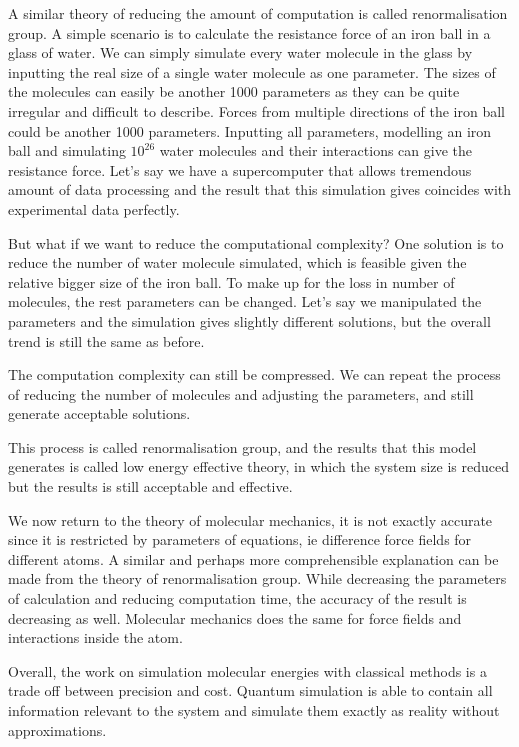 \documentclass[12pt]{article}
\begin{document}
A similar theory of reducing the amount of computation is called renormalisation group. A simple scenario is to calculate the resistance force of an
 iron ball in a glass of water. We can simply simulate every water molecule in the glass by inputting the real size of a single water molecule as one
  parameter. The sizes of the molecules can easily be another 1000 parameters as they can be quite irregular and difficult to describe. Forces from
  multiple directions of the iron ball could be another 1000 parameters. Inputting all parameters, modelling an iron ball and simulating $10^{26}$
  water molecules and their interactions can give the resistance force. Let’s say we have a supercomputer that allows tremendous amount of data
  processing and the result that this simulation gives coincides with experimental data perfectly.

But what if we want to reduce the computational complexity? One solution is to reduce the number of water molecule simulated, which is feasible given
 the relative bigger size of the iron ball. To make up for the loss in number of molecules, the rest parameters can be changed. Let’s say we
 manipulated the parameters and the simulation gives slightly different solutions, but the overall trend is still the same as before.

The computation complexity can still be compressed. We can repeat the process of reducing the number of molecules and adjusting the parameters,
 and still generate acceptable solutions.

This process is called renormalisation group, and the results that this model generates is called low energy effective theory, in which the system
 size is reduced but the results is still acceptable and effective.

We now return to the theory of molecular mechanics, it is not exactly accurate since it is restricted by parameters of equations, ie difference
force fields for different atoms. A similar and perhaps more comprehensible explanation can be made from the theory of renormalisation group.
While decreasing the parameters of calculation and reducing computation time, the accuracy of the result is decreasing as well. Molecular mechanics
 does the same for force fields and interactions inside the atom.

Overall, the work on simulation molecular energies with classical methods is a trade off between precision and cost. Quantum simulation is able
to contain all information relevant to the system and simulate them exactly as reality without approximations.
\end{document}
